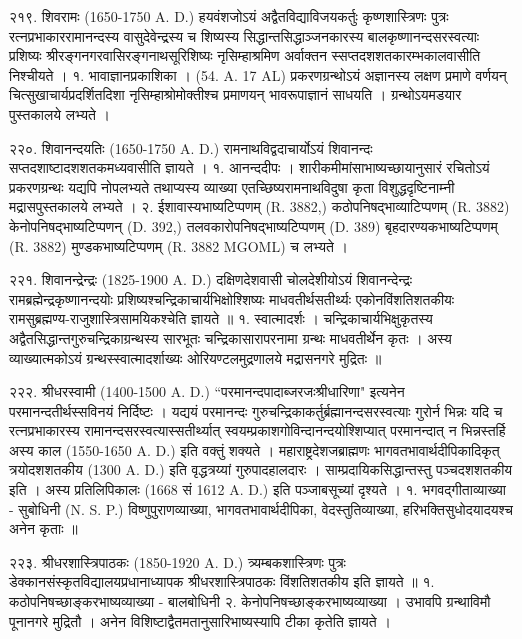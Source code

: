 २१९. शिवरामः (1650-1750 A. D.)
हयवंशजोऽयं अद्वैतविद्याविजयकर्तुः कृष्णशास्त्रिणः पुत्रः रत्नप्रभाकाररामानन्दस्य वासुदेवेन्द्रस्य च शिष्यस्य सिद्धान्तसिद्धाञ्जनकारस्य बालकृष्णानन्दसरस्वत्याः प्रशिष्यः श्रीरङ्गनगरवासिरङ्गनाथसूरिशिष्यः नृसिम्हाश्रमिण अर्वाक्तन स्सप्तदशशतकारम्भकालवासीति निश्चीयते ।
१. भावाज्ञानप्रकाशिका । (54. A. 17 AL) प्रकरणग्रन्थोऽयं अज्ञानस्य लक्षण प्रमाणे वर्णयन् चित्सुखाचार्यप्रदर्शितदिशा नृसिम्हाश्रोमोक्तीश्च प्रमाणयन् भावरूपाज्ञानं साधयति । ग्रन्थोऽयमडयार पुस्तकालये लभ्यते ।

२२०. शिवानन्दयतिः (1650-1750 A. D.)
रामनाथविद्वदाचार्योऽयं शिवानन्दः सप्तदशाष्टादशशतकमध्यवासीति ज्ञायते । 
१. आनन्ददीपः । शारीकमीमांसाभाष्यच्छायानुसारं रचितोऽयं प्रकरणग्रन्थः यद्यपि नोपलभ्यते तथाप्यस्य व्याख्या एतच्छिष्यरामनाथविदुषा कृता विशुद्धदृष्टिनाम्नी मद्रासपुस्तकालये लभ्यते ।
२. ईशावास्यभाष्यटिप्पणम् (R. 3882,) कठोपनिषद्भाव्याटिप्पणम् (R. 3882) केनोपनिषद्भाष्यटिप्पणन् (D. 392,) तलवकारोपनिषद्भाष्यटिप्पणम् (D. 389) बृहदारण्यकभाष्यटिप्पणम् (R. 3882) मुण्डकभाष्यटिप्पणम् (R. 3882 MGOML) च लभ्यते ।

२२१. शिवानन्द्रेन्द्रः (1825-1900 A. D.)
दक्षिणदेशवासी चोलदेशीयोऽयं शिवानन्देन्द्रः रामब्रह्मेन्द्रकृष्णानन्दयोः प्रशिष्यश्चन्द्रिकाचार्यभिक्षोश्शिष्यः माधवतीर्थसतीर्थ्यः एकोनविंशतिशतकीयः रामसुब्रह्मण्य-राजुशास्त्रिसामयिकश्चेति ज्ञायते ॥
१. स्वात्मादर्शः । चन्द्रिकाचार्यभिक्षुकृतस्य अद्वैतसिद्धान्तगुरुचन्द्रिकाग्रन्थस्य सारभूतः चन्द्रिकासारापरनामा ग्रन्थः माधवतीर्थेन कृतः । अस्य व्याख्यात्मकोऽयं ग्रन्थस्स्वात्मादर्शाख्यः ओरियण्टलमुद्रणालये मद्रासनगरे मुद्रितः ॥

२२२. श्रीधरस्वामी (1400-1500 A. D.)
``परमानन्दपादाब्जरजःश्रीधारिणा" इत्यनेन परमानन्दतीर्थस्सविनयं निर्दिष्टः । यद्ययं परमानन्दः गुरुचन्द्रिकाकर्तुर्ब्रह्मानन्दसरस्वत्याः गुरोर्न भिन्नः यदि च रत्नप्रभाकारस्य रामानन्दसरस्वत्यास्सतीर्थ्यात् स्वयम्प्रकाशगोविन्दानन्दयोश्शिप्यात् परमानन्दात् न भिन्नस्तर्हि अस्य काल (1550-1650 A. D.) इति वक्तुं शक्यते । महाराष्ट्रदेशजब्राह्मणः भागवतभावार्थदीपिकादिकृत् त्रयोदशशतकीय (1300 A. D.) इति वृद्धत्रय्यां गुरुपादहालदारः । साम्प्रदायिकसिद्धान्तस्तु पञ्चदशशतकीय इति । अस्य प्रतिलिपिकालः (1668 सं 1612 A. D.) इति पञ्जाबसूच्यां दृश्यते ।
१. भगवद्गीताव्याख्या - सुबोधिनी (N. S. P.)
विष्णुपुराणव्याख्या, भागवतभावार्थदीपिका, वेदस्तुतिव्याख्या, हरिभक्तिसुधोदयादयश्च अनेन कृताः ॥

२२३. श्रीधरशास्त्रिपाठकः (1850-1920 A. D.)
त्र्यम्बकशास्त्रिणः पुत्रः डेक्कानसंस्कृतविद्यालयप्रधानाध्यापक श्रीधरशास्त्रिपाठकः विंशतिशतकीय इति ज्ञायते ॥
१. कठोपनिषच्छाङ्करभाष्यव्याख्या - बालबोधिनी
२. केनोपनिषच्छाङ्करभाष्यव्याख्या ।
उभावपि ग्रन्थाविमौ पूनानगरे मुद्रितौ । अनेन विशिष्टाद्वैतमतानुसारिभाष्यस्यापि टीका कृतेति ज्ञायते ।

